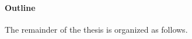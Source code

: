 \documentclass[../thesis.tex]{subfiles}
\begin{document}


%

%

\paragraph{Outline}
The remainder of the thesis is organized as follows.

\end{document}
